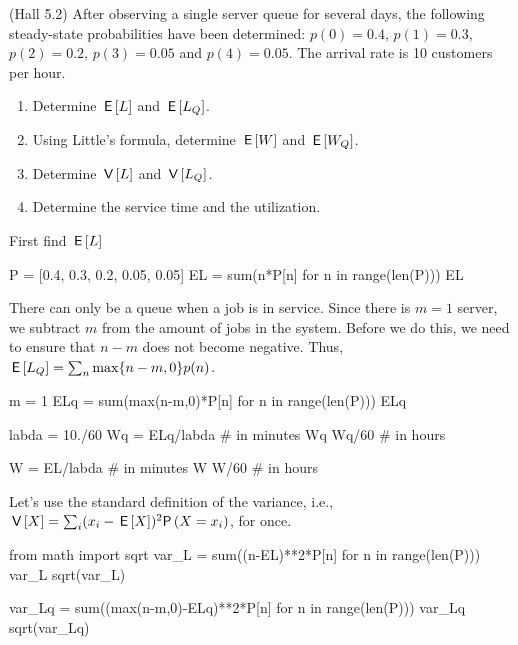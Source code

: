 \begin{exercise}(Hall 5.2) \label{exer: Hall} After observing a single server queue for
  several days, the following steady-state probabilities have been
  determined: $p(0)=0.4$, $p(1) = 0.3$, $p(2)=0.2$, $p(3)=0.05$ and
  $p(4)=0.05$. The arrival rate is 10 customers per hour. 
  \begin{enumerate}
  \item Determine $\,\mathsf{E}\left[L\right]$ and  $\,\mathsf{E}\left[L_Q\right]$. 
  \item Using Little's formula, determine $\,\mathsf{E}\left[W\right]$ and $\,\mathsf{E}\left[W_Q\right]$. 
\item Determine $\,\mathsf{V}\left[L\right]$ and $\,\mathsf{V}\left[L_Q\right]$.
  \item Determine the service time and the utilization.
  \end{enumerate}
    \begin{solution} First find $\,\mathsf{E}\left[L\right]$


\begin{pyconsole}
P = [0.4, 0.3, 0.2, 0.05, 0.05]
EL = sum(n*P[n] for n in range(len(P)))
EL
\end{pyconsole}

There can only be a queue when a job is in service. Since there is
$m=1$ server, we subtract $m$ from the amount of jobs in the system.
Before we do this, we need to ensure that $n-m$ does not become
negative. Thus, $\,\mathsf{E}\left[L_Q\right] = \sum_n \max\{n-m, 0\} p(n)$.

\begin{pyconsole}
m = 1
ELq = sum(max(n-m,0)*P[n] for n in range(len(P)))
ELq
\end{pyconsole}


\begin{pyconsole}
labda = 10./60
Wq = ELq/labda # in minutes
Wq
Wq/60 # in hours

W = EL/labda # in minutes
W
W/60 # in hours
\end{pyconsole}

Let's use the standard definition of the variance, i.e., $\V X = \sum_{i} (x_i-\E X)^2 \P{X=x_i}$, for once.

\begin{pyconsole}
from math import sqrt
var_L = sum((n-EL)**2*P[n] for n in range(len(P)))
var_L
sqrt(var_L)
\end{pyconsole}


\begin{pyconsole}
var_Lq = sum((max(n-m,0)-ELq)**2*P[n] for n in range(len(P)))
var_Lq
sqrt(var_Lq)
\end{pyconsole}



\end{solution}
\end{exercise}
